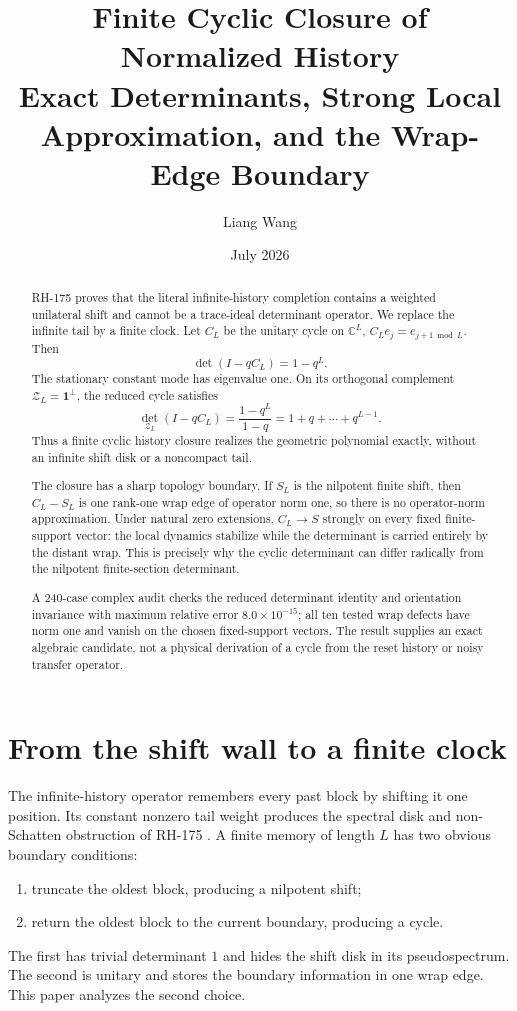 \documentclass[12pt]{article}
\title{Finite Cyclic Closure of Normalized History\\
\large Exact Determinants, Strong Local Approximation, and the Wrap-Edge Boundary}
\author{Liang Wang}
\date{July 2026}
\theoremstyle{remark}
\newcommand{\cZ}{\mathcal Z}
\begin{document}
\maketitle

\begin{abstract}
RH-175 proves that the literal infinite-history completion contains a
weighted unilateral shift and cannot be a trace-ideal determinant operator.
We replace the infinite tail by a finite clock.  Let $C_L$ be the unitary
cycle on $\mathbb C^L$, $C_Le_j=e_{j+1\bmod L}$.  Then
\[
 \det(I-qC_L)=1-q^L.
\]
The stationary constant mode has eigenvalue one.  On its orthogonal
complement $\cZ_L=\mathbf1^\perp$, the reduced cycle satisfies
\[
 \det_{\cZ_L}(I-qC_L)=
 \frac{1-q^L}{1-q}=1+q+\cdots+q^{L-1}.
\]
Thus a finite cyclic history closure realizes the geometric polynomial
exactly, without an infinite shift disk or a noncompact tail.

The closure has a sharp topology boundary.  If $S_L$ is the nilpotent finite
shift, then $C_L-S_L$ is one rank-one wrap edge of operator norm one, so there
is no operator-norm approximation.  Under natural zero extensions,
$C_L\to S$ strongly on every fixed finite-support vector: the local dynamics
stabilize while the determinant is carried entirely by the distant wrap.
This is precisely why the cyclic determinant can differ radically from the
nilpotent finite-section determinant.

A 240-case complex audit checks the reduced determinant identity and
orientation invariance with maximum relative error $8.0\times10^{-15}$; all
ten tested wrap defects have norm one and vanish on the chosen fixed-support
vectors.  The result supplies an exact algebraic candidate, not a physical
derivation of a cycle from the reset history or noisy transfer operator.
\end{abstract}

\section{From the shift wall to a finite clock}

The infinite-history operator remembers every past block by shifting it one
position.  Its constant nonzero tail weight produces the spectral disk and
non-Schatten obstruction of RH-175 \citep{WangRH175}.  A finite memory of
length $L$ has two obvious boundary conditions:
\begin{enumerate}[leftmargin=2em]
\item truncate the oldest block, producing a nilpotent shift;
\item return the oldest block to the current boundary, producing a cycle.
\end{enumerate}
The first has trivial determinant $1$ and hides the shift disk in its
pseudospectrum.  The second is unitary and stores the boundary information in
one wrap edge.  This paper analyzes the second choice.
\end{document}
